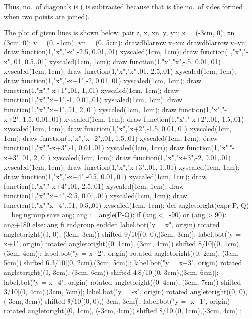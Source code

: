   Thus, no.\ of diagonals is ( is subtracted because that is the no.\ of sides
  formed when two points are joined).
\item The plot of given lines is shown below:
  \startplacefigure[location={left, none}]
  \startMPcode
    pair z, x, xn, y, yn;
    x = (-3cm, 0);
    xn = (3cm, 0);
    y = (0, -1cm);
    yn = (0, 5cm);
    drawdblarrow x--xn;
    drawdblarrow y--yn;
    draw function(1,"x","-x",-2.5, 0.01,.01) xyscaled(1cm, 1cm);
    draw function(1,"x","-x",.01, 0.5,.01) xyscaled(1cm, 1cm);
    draw function(1,"x","x",-.5, 0.01,.01) xyscaled(1cm, 1cm);
    draw function(1,"x","x",.01, 2.5,.01) xyscaled(1cm, 1cm);
    draw function(1,"x","-x+1",-2, 0.01,.01) xyscaled(1cm, 1cm);
    draw function(1,"x","-x+1",.01, 1,.01) xyscaled(1cm, 1cm);
    draw function(1,"x","x+1",-1, 0.01,.01) xyscaled(1cm, 1cm);
    draw function(1,"x","x+1",.01, 2,.01) xyscaled(1cm, 1cm);
    draw function(1,"x","-x+2",-1.5, 0.01,.01) xyscaled(1cm, 1cm);
    draw function(1,"x","-x+2",.01, 1.5,.01) xyscaled(1cm, 1cm);
    draw function(1,"x","x+2",-1.5, 0.01,.01) xyscaled(1cm, 1cm);
    draw function(1,"x","x+2",.01, 1.5,.01) xyscaled(1cm, 1cm);
    draw function(1,"x","-x+3",-1, 0.01,.01) xyscaled(1cm, 1cm);
    draw function(1,"x","-x+3",.01, 2,.01) xyscaled(1cm, 1cm);
    draw function(1,"x","x+3",-2, 0.01,.01) xyscaled(1cm, 1cm);
    draw function(1,"x","x+3",.01, 1,.01) xyscaled(1cm, 1cm);
    draw function(1,"x","-x+4",-0.5, 0.01,.01) xyscaled(1cm, 1cm);
    draw function(1,"x","-x+4",.01, 2.5,.01) xyscaled(1cm, 1cm);
    draw function(1,"x","x+4",-2.5, 0.01,.01) xyscaled(1cm, 1cm);
    draw function(1,"x","x+4",.01, 0.5,.01) xyscaled(1cm, 1cm);
    def angletoright(expr P, Q) =
      begingroup save ang;
        ang := angle(P-Q);
        if (ang <=-90) or (ang > 90): ang+180 else: ang fi
      endgroup
    enddef;
    label.bot("y = x", origin) rotated angletoright((0, 0), (3cm, 3cm)) shifted 9/10[(0, 0),(3cm, 3cm)];
    label.bot("y = x+1", origin) rotated angletoright((0, 1cm), (3cm, 4cm)) shifted 8/10[(0, 1cm),(3cm, 4cm)];
    label.bot("y = x+2", origin) rotated angletoright((0, 2cm), (3cm, 5cm)) shifted 6.3/10[(0, 2cm),(3cm, 5cm)];
    label.bot("y = x+3", origin) rotated angletoright((0, 3cm), (3cm, 6cm)) shifted 4.8/10[(0, 3cm),(3cm, 6cm)];
    label.bot("y = x+4", origin) rotated angletoright((0, 4cm), (3cm, 7cm)) shifted 3/10[(0, 4cm),(3cm, 7cm)];
    label.bot("y = -x", origin) rotated angletoright((0, 0), (-3cm, 3cm)) shifted 9/10[(0, 0),(-3cm, 3cm)];
    label.bot("y = -x+1", origin) rotated angletoright((0, 1cm), (-3cm, 4cm)) shifted 8/10[(0, 1cm),(-3cm, 4cm)];
